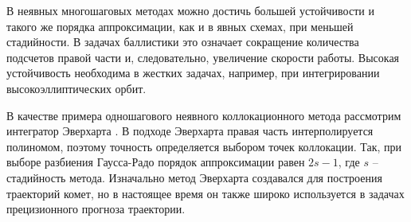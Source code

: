 В неявных многошаговых методах можно достичь большей устойчивости и такого же порядка аппроксимации, 
как и в явных схемах, при меньшей стадийности. В задачах баллистики это означает сокращение количества 
подсчетов правой части и, следовательно, увеличение скорости работы. Высокая устойчивость
необходима в жестких задачах, например, при интегрировании высокоэллиптических орбит.

В качестве примера одношагового неявного коллокационного метода рассмотрим 
интегратор Эверхарта \cite{Everhart1985}. В подходе Эверхарта правая часть интерполируется полиномом,
поэтому точность определяется выбором точек коллокации. Так, при выборе разбиения
Гаусса-Радо порядок аппроксимации равен $2 s - 1$, где $s$ -- стадийность метода.
Изначально метод Эверхарта создавался для построения траекторий комет, 
но в настоящее время он также широко используется в задачах прецизионного прогноза траектории.